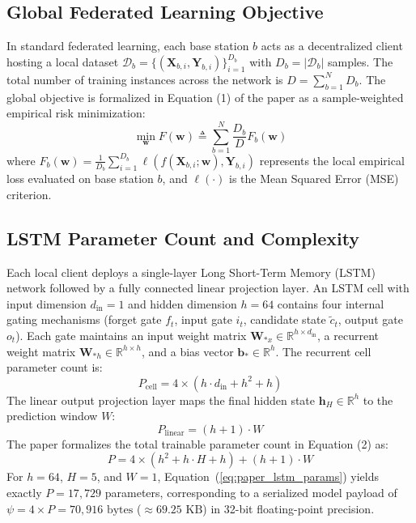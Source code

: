 \documentclass[10pt,journal,compsoc,twocolumn]{article}
\begin{document}
\subsection{Global Federated Learning Objective}
In standard federated learning, each base station $b$ acts as a decentralized client hosting a local dataset $\mathcal{D}_b = \{(\mathbf{X}_{b,i}, \mathbf{Y}_{b,i})\}_{i=1}^{D_b}$ with $D_b = |\mathcal{D}_b|$ samples. The total number of training instances across the network is $D = \sum_{b=1}^N D_b$. The global objective is formalized in Equation (1) of the paper as a sample-weighted empirical risk minimization:
\begin{equation}
    \min_{\mathbf{w}} F(\mathbf{w}) \triangleq \sum_{b=1}^N \frac{D_b}{D} F_b(\mathbf{w})
    \label{eq:global_obj}
\end{equation}
where $F_b(\mathbf{w}) = \frac{1}{D_b} \sum_{i=1}^{D_b} \ell(f(\mathbf{X}_{b,i}; \mathbf{w}), \mathbf{Y}_{b,i})$ represents the local empirical loss evaluated on base station $b$, and $\ell(\cdot)$ is the Mean Squared Error (MSE) criterion.

\subsection{LSTM Parameter Count and Complexity}
Each local client deploys a single-layer Long Short-Term Memory (LSTM) network followed by a fully connected linear projection layer. An LSTM cell with input dimension $d_{\text{in}} = 1$ and hidden dimension $h = 64$ contains four internal gating mechanisms (forget gate $f_t$, input gate $i_t$, candidate state $\tilde{c}_t$, output gate $o_t$). Each gate maintains an input weight matrix $\mathbf{W}_{*x} \in \mathbb{R}^{h \times d_{\text{in}}}$, a recurrent weight matrix $\mathbf{W}_{*h} \in \mathbb{R}^{h \times h}$, and a bias vector $\mathbf{b}_* \in \mathbb{R}^h$. The recurrent cell parameter count is:
\begin{equation}
    P_{\text{cell}} = 4 \times \left( h \cdot d_{\text{in}} + h^2 + h \right)
\end{equation}
The linear output projection layer maps the final hidden state $\mathbf{h}_H \in \mathbb{R}^h$ to the prediction window $W$:
\begin{equation}
    P_{\text{linear}} = (h + 1) \cdot W
\end{equation}
The paper formalizes the total trainable parameter count in Equation (2) as:
\begin{equation}
    P = 4 \times (h^2 + h \cdot H + h) + (h + 1) \cdot W
    \label{eq:paper_lstm_params}
\end{equation}
For $h = 64$, $H = 5$, and $W = 1$, Equation~(\ref{eq:paper_lstm_params}) yields exactly $P = 17,729$ parameters, corresponding to a serialized model payload of $\psi = 4 \times P = 70,916\text{ bytes}$ ($\approx 69.25\text{ KB}$) in 32-bit floating-point precision.
\end{document}
